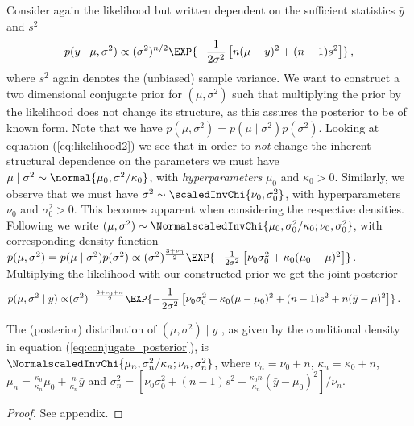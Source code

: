 Consider again the likelihood but written dependent on the sufficient statistics $\bar{y}$ and $s^2$
\begin{align}
  p(y \mid \mu, \sigma^2) \propto (\sigma^2)^{n/2} \EXP{-\frac{1}{2\sigma^2} \left[ n(\mu - \bar{y})^2 + (n-1)s^2 \right]} \,,
  \label{eq:likelihood2}
\end{align}
where $s^2$ again denotes the (unbiased) sample variance.
We want to construct a two dimensional conjugate prior for $(\mu, \sigma^2)$ such that multiplying the prior by the likelihood does not change its structure, as this assures the posterior to be of known form.
Note that we have $p(\mu, \sigma^2) = p(\mu \mid \sigma^2) p(\sigma^2)$.
Looking at equation (\ref{eq:likelihood2}) we see that in order to \emph{not} change the inherent structural dependence on the parameters we must have $\mu \mid \sigma^2 \sim \normal{\mu_0, \sigma^2 / \kappa_0}$, with \emph{hyperparameters} $\mu_0$ and $\kappa_0 > 0$.
Similarly, we observe that we must have $\sigma^2 \sim \scaledInvChi{\nu_0, \sigma_0^2}$, with hyperparameters $\nu_0$ and $\sigma_0^2 > 0$.
This becomes apparent when considering the respective densities.
Following \citet{gelmanbda04} we write $(\mu, \sigma^2) \sim \NormalscaledInvChi{\mu_0, \sigma_0^2 / \kappa_0; \nu_0, \sigma_0^2}$, with corresponding density function $p(\mu, \sigma^2) = p(\mu \mid \sigma^2) p(\sigma^2) \propto (\sigma^2)^{\frac{3 + \nu_0}{2}} \EXP{-\frac{1}{2\sigma^2} \left[\nu_0 \sigma_0^2 + \kappa_0(\mu_0 - \mu)^2 \right]}$.
Multiplying the likelihood with our constructed prior we get the joint posterior
\begin{align}
  p(\mu, \sigma^2 \mid y) \propto& (\sigma^2)^{-\frac{3 + \nu_0 + n}{2}} \EXP{-\frac{1}{2 \sigma^2} \left[\nu_0\sigma_0^2 + \kappa_0(\mu - \mu_0)^2 + (n-1)s^2 + n(\bar{y} - \mu)^2 \right]} \,.
  \label{eq:conjugate_posterior}
\end{align}

\begin{proposition}
  The (posterior) distribution of $(\mu, \sigma^2) \mid y$ , as given by the conditional density in equation (\ref{eq:conjugate_posterior}), is $\NormalscaledInvChi{\mu_n, \sigma_n^2/\kappa_n; \nu_n, \sigma_n^2}$, where
    $\nu_n = \nu_0 + n$, $\kappa_n = \kappa_0 + n$, $\mu_n =\frac{\kappa_0}{\kappa_n}\mu_0 + \frac{n}{\kappa_n}\bar{y}$ and $\sigma_n^2 = \left[\nu_0 \sigma_0^2 + (n-1)s^2 + \frac{\kappa_0 n}{\kappa_n} (\bar{y} - \mu_0)^2\right] /\nu_n$.
  \label{prop:posterior_conjugate}
\end{proposition}
\begin{proof}
  See appendix.
\end{proof}

